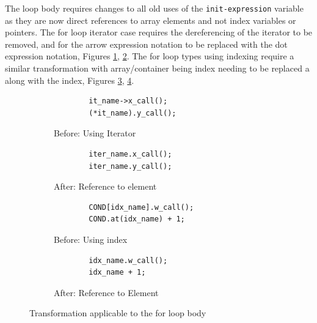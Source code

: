 \documentclass[bsc,frontabs,singlespacing,twoside,parskip,deptreport]{infthesis}
\begin{document}
The loop body requires changes to all old uses of the \texttt{init-expression} variable as they are now direct references to array elements and not index variables or pointers. The for loop iterator case requires the dereferencing of the iterator to be removed, and for the arrow expression notation to be replaced with the dot expression notation, Figures \ref{fig:before-tran-iter}, \ref{fig:after-tran-iter}. The for loop types using indexing require a similar transformation with array/container being index needing to be replaced a along with the index, Figures \ref{fig:before-tran-idx}, \ref{fig:after-tran-idx}.

\begin{figure}[H]
    \centering
  \begin{subfigure}[t]{0.45\textwidth}
        \centering
        \begin{verbatim}
        it_name->x_call();
        (*it_name).y_call();
        \end{verbatim}
        \caption{Before: Using Iterator}
        \label{fig:before-tran-iter}
        \vspace{0.40cm}
    \end{subfigure}
    \hfill
    \begin{subfigure}[t]{0.45\textwidth}
        \begin{verbatim}
        iter_name.x_call();
        iter_name.y_call();
        \end{verbatim}
        \caption{After: Reference to element}
        \centering
        \label{fig:after-tran-iter}
    \end{subfigure}
    
     \begin{subfigure}[t]{0.45\textwidth}
        \centering
        \begin{verbatim}
        COND[idx_name].w_call();
        COND.at(idx_name) + 1;
        \end{verbatim}
        \caption{Before: Using index}
        \label{fig:before-tran-idx}
        \vspace{0.40cm}
    \end{subfigure}
    \hfill
    \begin{subfigure}[t]{0.45\textwidth}
        \begin{verbatim}
        idx_name.w_call();
        idx_name + 1;
        \end{verbatim}
        \caption{After: Reference to Element}
        \centering
        \label{fig:after-tran-idx}
    \end{subfigure}

    \caption{Transformation applicable to the for loop body}
    \label{fig:code-trans-loop-body}
\end{figure}
\end{document}
